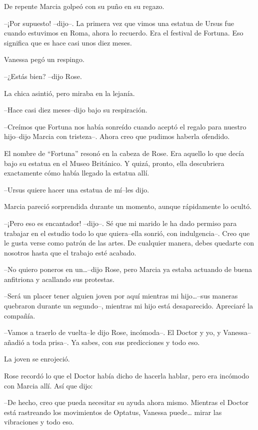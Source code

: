 De repente Marcia golpeó con su puño en su regazo.

--¡Por supuesto! --dijo--. La primera vez que vimos una estatua de Ursus
fue cuando estuvimos en Roma, ahora lo recuerdo. Era el festival de
Fortuna. Eso significa que es hace casi unos diez meses.

Vanessa pegó un respingo.

--¿Estás bien? --dijo Rose.

La chica asintió, pero miraba en la lejanía.

--Hace casi diez meses--dijo bajo su respiración.

--Creímos que Fortuna nos había sonreído cuando aceptó el regalo para
nuestro hijo--dijo Marcia con tristeza--. Ahora creo que pudimos haberla
ofendido.

El nombre de ``Fortuna'' resonó en la cabeza de Rose. Era aquello lo que
decía bajo su estatua en el Museo Británico. Y quizá, pronto, ella
descubriera exactamente cómo había llegado la estatua allí.

--Ursus quiere hacer una estatua de mí--les dijo.

Marcia pareció sorprendida durante un momento, aunque rápidamente lo
ocultó.

--¡Pero eso es encantador! --dijo--. Sé que mi marido le ha dado permiso
para trabajar en el estudio todo lo que quiera--ella sonrió, con
indulgencia--. Creo que le gusta verse como patrón de las artes. De
cualquier manera, debes quedarte con nosotros hasta que el trabajo esté
acabado.

--No quiero poneros en un\ldots{}--dijo Rose, pero Marcia ya estaba
actuando de buena anfitriona y acallando sus protestas.

--Será un placer tener alguien joven por aquí mientras mi
hijo\ldots{}--sus maneras quebraron durante un segundo--, mientras mi
hijo está desaparecido. Apreciaré la compañía.

--Vamos a traerlo de vuelta--le dijo Rose, incómoda--. El Doctor y yo, y
Vanessa--añadió a toda prisa--. Ya sabes, con sus predicciones y todo
eso.

La joven se enrojeció.

Rose recordó lo que el Doctor había dicho de hacerla hablar, pero era
incómodo con Marcia allí. Así que dijo:

--De hecho, creo que pueda necesitar su ayuda ahora mismo. Mientras el
Doctor está rastreando los movimientos de Optatus, Vanessa puede\ldots{}
mirar las vibraciones y todo eso.

